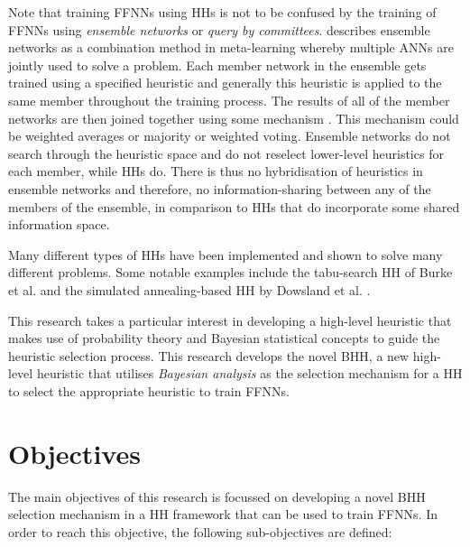 Note that training \acp{FFNN} using \acp{HH} is not to be confused by the
training of \acp{FFNN} using \textit{ensemble networks}
or \textit{query by committees}.
\citeauthor{ref:pappa:2014} \cite{ref:pappa:2014} describes ensemble networks as a combination method in
meta-learning whereby multiple \acp{ANN} are jointly used
to solve a problem. Each member network in the ensemble gets trained using a
specified heuristic and generally this heuristic is applied to the same member
throughout the training process. The results of all of the member networks are
then joined together using some mechanism \cite{ref:zhou:2002}. This mechanism
could be weighted averages or majority or weighted voting. Ensemble networks do not search through the heuristic space and do not
reselect lower-level heuristics for each member, while \acp{HH} do. There is
thus no hybridisation of heuristics in ensemble
networks and therefore, no information-sharing between any of the members of the
ensemble, in comparison to \acp{HH} that do incorporate some shared information
space.

Many different types of \acp{HH} have been implemented and shown to solve many
different problems. Some notable examples include the
tabu-search \ac{HH} of Burke et al. \cite{ref:burke:2010} and
the simulated annealing-based \ac{HH} by Dowsland et
al. \cite{ref:dowsland:2007}.  

This research takes a particular interest in developing a high-level heuristic
that makes use of probability theory and Bayesian statistical concepts to guide
the heuristic selection process. This research develops the novel \Ac{BHH}, a
new high-level heuristic that utilises \textit{Bayesian
analysis} as the selection mechanism for a \ac{HH} to select the appropriate
heuristic to train \acp{FFNN}. 


\section{Objectives}
\label{sec:introduction:objectives}

The main objectives of this research is focussed on developing a novel \Ac{BHH}
selection mechanism in a \ac{HH} framework that can be used to train \acp{FFNN}.
In order to reach this objective, the following sub-objectives are defined:

